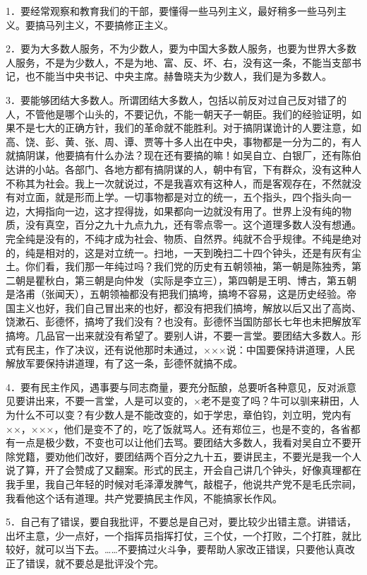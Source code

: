 1．要经常观察和教育我们的干部，要懂得一些马列主义，最好稍多一些马列主义。要搞马列主义，不要搞修正主义。

2．要为大多数人服务，不为少数人，要为中国大多数人服务，也要为世界大多数人服务，不是为少数人，不是为地、富、反、坏、右，没有这一条，不能当支部书记，也不能当中央书记、中央主席。赫鲁晓夫为少数人，我们是为多数人。

3．要能够团结大多数人。所谓团结大多数人，包括以前反对过自己反对错了的人，不管他是哪个山头的，不要记仇，不能一朝天子一朝臣。我们的经验证明，如果不是七大的正确方针，我们的革命就不能胜利。对于搞阴谋诡计的人要注意，如高、饶、彭、黄、张、周、谭、贾等十多人出在中央，事物都是一分为二的，有人就搞阴谋，他要搞有什么办法？现在还有要搞的嘛！如吴自立、白银厂，还有陈伯达讲的小站。各部门、各地方都有搞阴谋的人，朝中有官，下有群众，没有这种人不称其为社会。我上一次就说过，不是我喜欢有这种人，而是客观存在，不然就没有对立面，就是形而上学。一切事物都是对立的统一，五个指头，四个指头向一边，大拇指向一边，这才捏得拢，如果都向一边就没有用了。世界上没有纯的物质，没有真空，百分之九十九点九九，还有零点零一。这个道理多数人没有想通。完全纯是没有的，不纯才成为社会、物质、自然界。纯就不合乎规律。不纯是绝对的，纯是相对的，这是对立统一。扫地，一天到晚扫二十四个钟头，还是有灰有尘土。你们看，我们那一年纯过吗？我们党的历史有五朝领袖，第一朝是陈独秀，第二朝是瞿秋白，第三朝是向仲发（实际是李立三），第四朝是王明、博古，第五朝是洛甫（张闻天），五朝领袖都没有把我们搞垮，搞垮不容易，这是历史经验。帝国主义也好，我们自己冒出来的也好，都没有把我们搞垮，解放以后又出了高岗、饶漱石、彭德怀，搞垮了我们没有？也没有。彭德怀当国防部长七年也未把解放军搞垮。几品官一出来就没有希望了。要别人讲，不要一言堂。要团结大多数人。形式有民主，作了决议，还有说他那时未通过，×××说：中国要保持讲道理，人民解放军要保持讲道理，有了这一条，彭德怀就搞不成。

4．要有民主作风，遇事要与同志商量，要充分酝酿，总要听各种意见，反对派意见要讲出来，不要一言堂，人是可以变的，×老不是变了吗？牛可以驯来耕田，人为什么不可以变？有少数人是不能改变的，如于学忠，章伯钧，刘立明，党内有××，×××，他们是变不了的，吃了饭就骂人。还有郑位三，也是不变的，各省都有一点是极少数，不变也可以让他们去骂。要团结大多数人，我看对吴自立不要开除党籍，要劝他们改好，要团结两个百分之九十五，要讲民主，不要光是我一个人说了算，开了会赞成了又翻案。形式的民主，开会自己讲几个钟头，好像真理都在我手里，我自己年轻的时候对毛泽潭发脾气，敲棍子，他说共产党不是毛氏宗祠，我看他这个话有道理。共产党要搞民主作风，不能搞家长作风。

5．自己有了错误，要自我批评，不要总是自己对，要比较少出错主意。讲错话，出坏主意，少一点好，一个指挥员指挥打仗，三个仗，一个打败，二个打胜，就比较好，就可以当下去。……不要搞过火斗争，要帮助人家改正错误，只要他认真改正了错误，就不要总是批评没个完。

